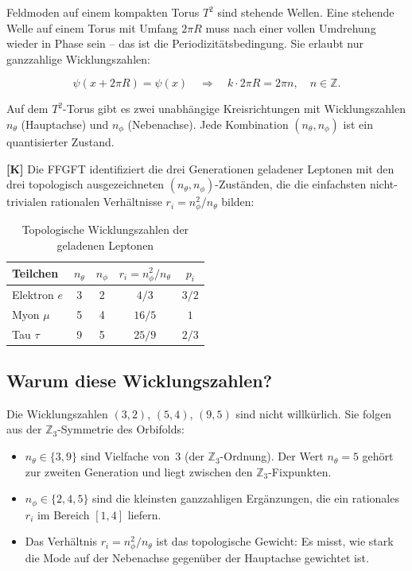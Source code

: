 Feldmoden auf einem kompakten Torus $T^2$ sind stehende Wellen. Eine
stehende Welle auf einem Torus mit Umfang $2\pi R$ muss nach einer
vollen Umdrehung wieder in Phase sein -- das ist die
Periodizitätsbedingung. Sie erlaubt nur ganzzahlige Wicklungszahlen:

\begin{equation}
  \psi(x + 2\pi R) = \psi(x)
  \quad \Rightarrow \quad
  k \cdot 2\pi R = 2\pi n,\quad n \in \mathbb{Z}.
\end{equation}

Auf dem $T^2$-Torus gibt es zwei unabhängige Kreisrichtungen mit
Wicklungszahlen $n_\theta$ (Hauptachse) und $n_\phi$ (Nebenachse).
Jede Kombination $(n_\theta, n_\phi)$ ist ein quantisierter Zustand.

\textbf{[K]} Die FFGFT identifiziert die drei Generationen geladener
Leptonen mit den drei topologisch ausgezeichneten
$(n_\theta, n_\phi)$-Zuständen, die die einfachsten nicht-trivialen
rationalen Verhältnisse $r_i = n_\phi^2/n_\theta$ bilden:

\begin{table}[h]
\centering
\caption{Topologische Wicklungszahlen der geladenen Leptonen}
\label{tab:wicklung}
\begin{tabular}{lcccc}
\toprule
Teilchen & $n_\theta$ & $n_\phi$ & $r_i = n_\phi^2/n_\theta$ & $p_i$ \\
\midrule
Elektron $e$  & 3 & 2 & $4/3$  & $3/2$ \\
Myon $\mu$    & 5 & 4 & $16/5$ & $1$   \\
Tau $\tau$    & 9 & 5 & $25/9$ & $2/3$ \\
\bottomrule
\end{tabular}
\end{table}

\subsection{Warum diese Wicklungszahlen?}

Die Wicklungszahlen $(3,2)$, $(5,4)$, $(9,5)$ sind nicht willkürlich.
Sie folgen aus der $\mathbb{Z}_3$-Symmetrie des Orbifolds:

\begin{itemize}
  \item $n_\theta \in \{3, 9\}$ sind Vielfache von~$3$ (der
    $\mathbb{Z}_3$-Ordnung). Der Wert $n_\theta = 5$ gehört zur
    zweiten Generation und liegt zwischen den $\mathbb{Z}_3$-Fixpunkten.
  \item $n_\phi \in \{2, 4, 5\}$ sind die kleinsten ganzzahligen
    Ergänzungen, die ein rationales $r_i$ im Bereich $[1, 4]$ liefern.
  \item Das Verhältnis $r_i = n_\phi^2/n_\theta$ ist das topologische
    Gewicht: Es misst, wie stark die Mode auf der Nebenachse gegenüber
    der Hauptachse gewichtet ist.
\end{itemize}

